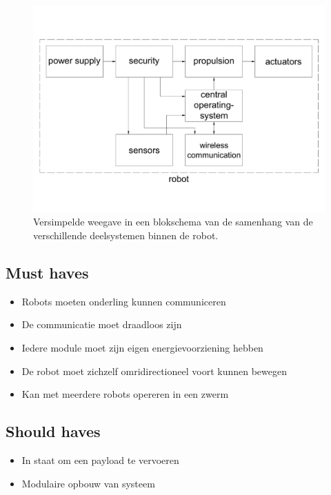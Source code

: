 \documentclass[10pt,a4paper]{article}
\begin{document}
\begin{figure}[h]
    \centering
    \includegraphics[width=1\textwidth]{blockschematic}
    \caption{Versimpelde weegave in een blokschema van de samenhang van de verschillende deelsystemen binnen de robot.}
    \label{fig:blockschematic}
\end{figure}



\subsection{Must haves}
\begin{itemize}
\item Robots moeten onderling kunnen communiceren
\item De communicatie moet draadloos zijn
\item Iedere module moet zijn eigen energievoorziening hebben
\item De robot moet zichzelf omridirectioneel voort kunnen bewegen
\item Kan met meerdere robots opereren in een zwerm
\end{itemize}

\subsection{Should haves}
\begin{itemize}
\item In staat om een payload te vervoeren
\item Modulaire opbouw van systeem
\end{itemize}
\end{document}
